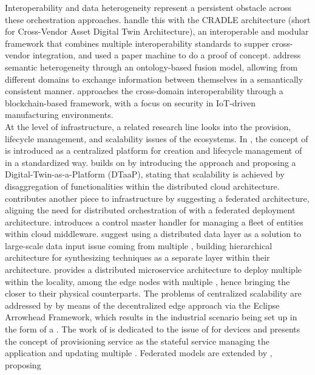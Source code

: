 Interoperability and data heterogeneity represent a persistent obstacle across these orchestration approaches. \cite{Juhlin2025} 
handle this with the CRADLE architecture (short for Cross-Vendor Asset Digital Twin Architecture), an interoperable and modular \DT 
framework that combines multiple interoperability standards to supper cross-vendor \DT integration, and used a paper machine to do a 
proof of concept. \cite{Wang2025} address semantic heterogeneity through an ontology-based fusion model, allowing \DTs from different 
domains to exchange information between themselves in a semantically consistent manner. \cite{Ali2025} approaches the cross-domain 
interoperability through a blockchain-based framework, with a focus on security in IoT-driven manufacturing environments.\\
At the level of infrastructure, a related research line looks into the provision, lifecycle management, and scalability issues of 
the \DTs ecosystems. In \cite{Talasila2023}, the concept of \DTaaS is introduced as a centralized platform 
for creation and lifecycle management of \DTs in a standardized way. \cite{Cakir2025} builds on \DTaaS by introducing the \IoTw approach and proposing a Digital-Twin-as-a-Platform (DTaaP), stating that scalability is achieved by disaggregation of 
\DT functionalities within the distributed cloud architecture. \cite{Frasheri2025} contributes another piece to \DT infrastructure by 
suggesting a federated \DTaaS architecture, aligning the need for distributed orchestration of \DTs with a federated \DTaaS deployment 
architecture. \cite{Merkle2019} introduces a control master handler for managing a fleet of entities within cloud middleware. 
\cite{Qian2024} suggest using a distributed data layer as a solution to large-scale data input issue coming from multiple \CPS, 
building hierarchical architecture for synthesizing \DT techniques as a separate layer within their architecture. \cite{Picone2023} 
provides a distributed microservice architecture to deploy multiple \EDTs within the locality, among the edge 
nodes with multiple \DTs, hence bringing the \DTs closer to their physical counterparts. The problems of centralized scalability are 
addressed by \cite{Tripathy2024} by means of the decentralized edge approach via the Eclipse Arrowhead Framework, which results in 
the industrial scenario being set up in the form of a \SoS. The work of \cite{Maree2024} is dedicated to the issue of 
\DaaS for \IoT devices and presents the concept of provisioning service as the stateful service managing the 
application and updating multiple \DTIs. Federated models are extended by \cite{Martella2025}, proposing 
